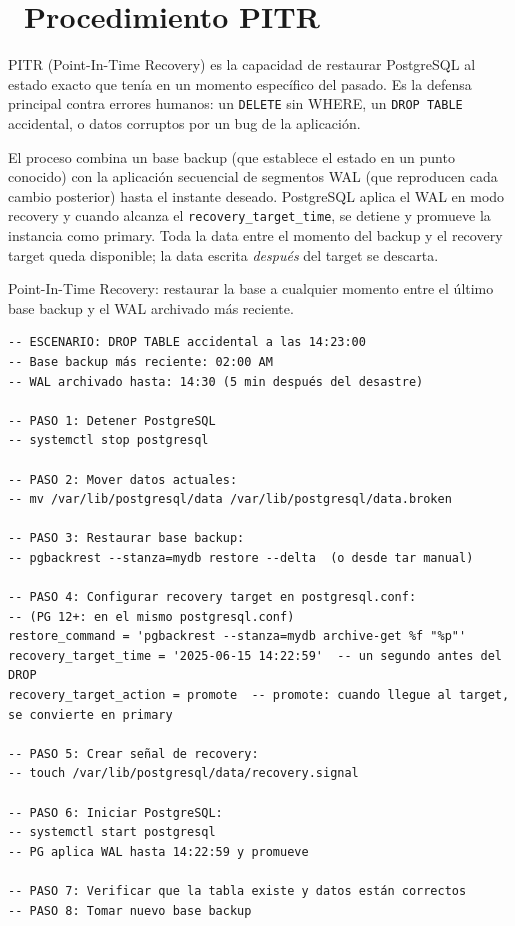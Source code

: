 \section[Procedimiento PITR]{~Procedimiento PITR}

PITR (Point-In-Time Recovery) es la capacidad de restaurar PostgreSQL al estado exacto que tenía en un momento específico del pasado.
Es la defensa principal contra errores humanos: un \texttt{DELETE} sin WHERE, un \texttt{DROP TABLE} accidental, o datos corruptos por un bug de la aplicación.

El proceso combina un base backup (que establece el estado en un punto conocido) con la aplicación secuencial de segmentos WAL (que reproducen cada cambio posterior) hasta el instante deseado.
PostgreSQL aplica el WAL en modo recovery y cuando alcanza el \texttt{recovery\_target\_time}, se detiene y promueve la instancia como primary.
Toda la data entre el momento del backup y el recovery target queda disponible; la data escrita \emph{después} del target se descarta.

Point-In-Time Recovery: restaurar la base a cualquier momento entre el último base backup y el WAL archivado más reciente.

\begin{lstlisting}[caption={PITR manual con pg\_restore + WAL}]
-- ESCENARIO: DROP TABLE accidental a las 14:23:00
-- Base backup más reciente: 02:00 AM
-- WAL archivado hasta: 14:30 (5 min después del desastre)

-- PASO 1: Detener PostgreSQL
-- systemctl stop postgresql

-- PASO 2: Mover datos actuales:
-- mv /var/lib/postgresql/data /var/lib/postgresql/data.broken

-- PASO 3: Restaurar base backup:
-- pgbackrest --stanza=mydb restore --delta  (o desde tar manual)

-- PASO 4: Configurar recovery target en postgresql.conf:
-- (PG 12+: en el mismo postgresql.conf)
restore_command = 'pgbackrest --stanza=mydb archive-get %f "%p"'
recovery_target_time = '2025-06-15 14:22:59'  -- un segundo antes del DROP
recovery_target_action = promote  -- promote: cuando llegue al target, se convierte en primary

-- PASO 5: Crear señal de recovery:
-- touch /var/lib/postgresql/data/recovery.signal

-- PASO 6: Iniciar PostgreSQL:
-- systemctl start postgresql
-- PG aplica WAL hasta 14:22:59 y promueve

-- PASO 7: Verificar que la tabla existe y datos están correctos
-- PASO 8: Tomar nuevo base backup
\end{lstlisting}

